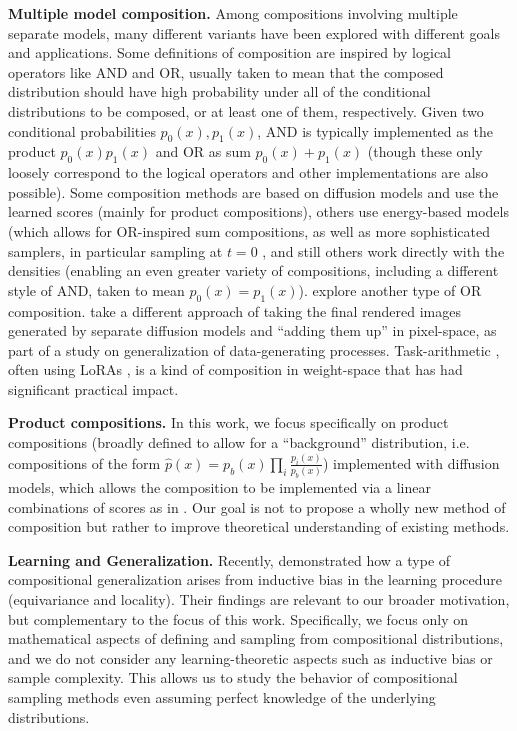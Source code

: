 \textbf{Multiple model composition.} Among compositions involving multiple separate models, many different variants have been explored with different goals and applications.
Some definitions of composition are inspired by logical operators like AND and OR, usually taken to mean that the composed distribution should have high probability under all of the conditional distributions to be composed, or at least one of them, respectively.
Given two conditional probabilities $p_0(x), p_1(x)$, AND is typically implemented as the product $p_0(x)p_1(x)$ and OR as sum $p_0(x) + p_1(x)$
(though these only loosely correspond to the logical operators and other implementations are also possible).
Some composition methods are based on diffusion models and use the learned scores (mainly for product compositions), others use energy-based models (which allows for OR-inspired sum compositions, as well as more sophisticated samplers, in particular sampling at $t=0$ \citep{du2020visualenergy, du2023reduce, liu2021learning}, and still others work directly with the densities \cite{skreta2024superposition} (enabling an even greater variety of compositions, including a different style of AND, taken to mean $p_0(x) = p_1(x)$). \citet{mcallister2025decentralized} explore another type of OR composition. \cite{wiedemer2024compositional} take a different approach of taking the final rendered images generated by separate diffusion models and ``adding them up'' in pixel-space, as part of a study on generalization of data-generating processes. Task-arithmetic \cite{zhang2023composing, ilharco2022editing}, often using LoRAs \cite{hu2021lora}, is a kind of composition in weight-space that has had significant practical impact.

\textbf{Product compositions.} In this work, we focus specifically on product compositions (broadly defined to allow for a ``background'' distribution, i.e. compositions of the form $\hat{p}(x) = p_b(x) \prod_i \frac{p_i(x)}{p_b(x)}$) implemented with diffusion models, which allows the composition to be implemented via a linear combinations of scores as in \citet{du2023reduce, liu2022compositional}. Our goal is not to propose
a wholly new method of composition but rather to improve theoretical understanding of existing methods.

\textbf{Learning and Generalization.}
Recently, \citet{kamb2024analytic}
demonstrated how a type of compositional generalization
arises from inductive bias in the learning procedure (equivariance
and locality).
Their findings are relevant to our broader motivation,
but complementary to the focus of this work.
Specifically, we focus only on mathematical aspects
of defining and sampling from compositional distributions,
and we do not consider any learning-theoretic aspects
such as inductive bias or sample complexity.
This allows us to study the behavior of
compositional sampling methods
even assuming perfect knowledge of the underlying distributions.
